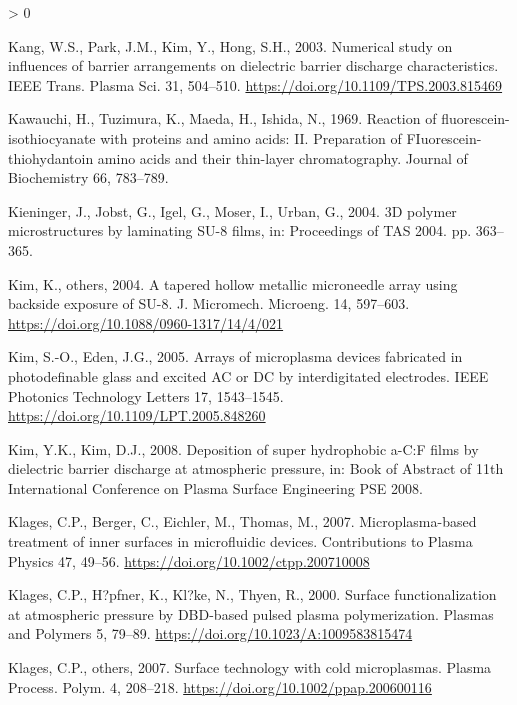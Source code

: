 \documentclass[
  11pt,
  twoside]{article}
\newlength{\cslhangindent}
\newenvironment{CSLReferences}[2] %
 {%
  \setlength{\parindent}{0pt}
  \ifodd #1 \everypar{\setlength{\hangindent}{\cslhangindent}}\ignorespaces\fi
  \ifnum #2 > 0
  \setlength{\parskip}{#2\baselineskip}
  \fi
 }%
 {}
\begin{document}
\begin{CSLReferences}{1}{0}
\leavevmode\hypertarget{ref-Kang03}{}%
Kang, W.S., Park, J.M., Kim, Y., Hong, S.H., 2003. Numerical study on influences of barrier arrangements on dielectric barrier discharge characteristics. IEEE Trans. Plasma Sci. 31, 504--510. \url{https://doi.org/10.1109/TPS.2003.815469}

\leavevmode\hypertarget{ref-Kawa1969}{}%
Kawauchi, H., Tuzimura, K., Maeda, H., Ishida, N., 1969. Reaction of fluorescein-isothiocyanate with proteins and amino acids: {II.} Preparation of FIuorescein-thiohydantoin amino acids and their thin-layer chromatography. Journal of Biochemistry 66, 783--789.

\leavevmode\hypertarget{ref-Kien04}{}%
Kieninger, J., Jobst, G., Igel, G., Moser, I., Urban, G., 2004. {3D} polymer microstructures by laminating {SU-8} films, in: {Proceedings of {}TAS 2004}. pp. 363--365.

\leavevmode\hypertarget{ref-Kim04}{}%
Kim, K., others, 2004. {A tapered hollow metallic microneedle array using backside exposure of SU-8}. J. Micromech. Microeng. 14, 597--603. \url{https://doi.org/10.1088/0960-1317/14/4/021}

\leavevmode\hypertarget{ref-Kim03}{}%
Kim, S.-O., Eden, J.G., 2005. Arrays of microplasma devices fabricated in photodefinable glass and excited {AC or DC} by interdigitated electrodes. IEEE Photonics Technology Letters 17, 1543--1545. \url{https://doi.org/10.1109/LPT.2005.848260}

\leavevmode\hypertarget{ref-Kim08}{}%
Kim, Y.K., Kim, D.J., 2008. Deposition of super hydrophobic {a-C:F} films by dielectric barrier discharge at atmospheric pressure, in: Book of Abstract of 11th International Conference on Plasma Surface Engineering PSE 2008.

\leavevmode\hypertarget{ref-Klag07-2}{}%
Klages, C.P., Berger, C., Eichler, M., Thomas, M., 2007. Microplasma-based treatment of inner surfaces in microfluidic devices. Contributions to Plasma Physics 47, 49--56. \url{https://doi.org/10.1002/ctpp.200710008}

\leavevmode\hypertarget{ref-Klag00}{}%
Klages, C.P., H?pfner, K., Kl?ke, N., Thyen, R., 2000. Surface functionalization at atmospheric pressure by {DBD}-based pulsed plasma polymerization. Plasmas and Polymers 5, 79--89. \url{https://doi.org/10.1023/A:1009583815474}

\leavevmode\hypertarget{ref-Klag07}{}%
Klages, C.P., others, 2007. Surface technology with cold microplasmas. Plasma Process. Polym. 4, 208--218. \url{https://doi.org/10.1002/ppap.200600116}


\end{CSLReferences}
\end{document}
